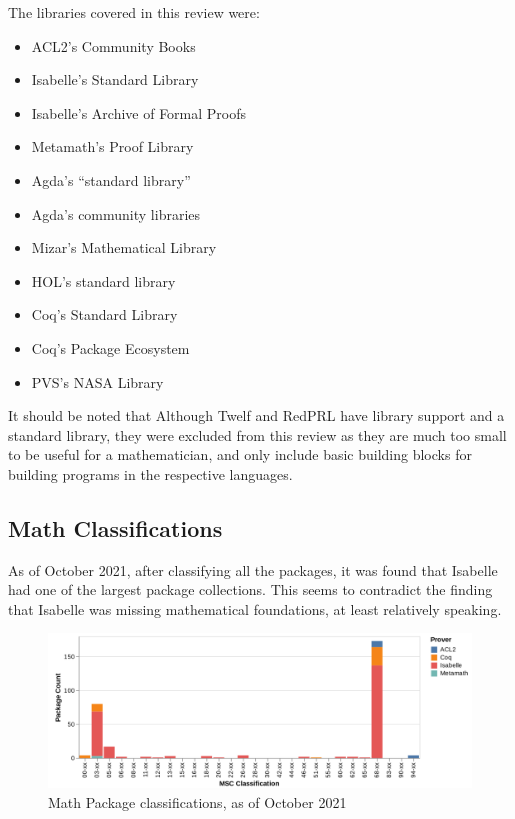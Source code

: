 \documentclass[
]{article}
\providecommand{\tightlist}{%
  \setlength{\itemsep}{0pt}\setlength{\parskip}{0pt}}
\begin{document}
The libraries covered in this review were:

\begin{itemize}
\tightlist
\item
  ACL2's Community Books
\item
  Isabelle's Standard Library
\item
  Isabelle's Archive of Formal Proofs
\item
  Metamath's Proof Library
\item
  Agda's ``standard library''
\item
  Agda's community libraries
\item
  Mizar's Mathematical Library
\item
  HOL's standard library
\item
  Coq's Standard Library
\item
  Coq's Package Ecosystem
\item
  PVS's NASA Library
\end{itemize}

It should be noted that Although Twelf and RedPRL have library support
and a standard library, they were excluded from this review as they are
much too small to be useful for a mathematician, and only include basic
building blocks for building programs in the respective languages.

\hypertarget{math-classifications}{%
\subsection{Math Classifications}\label{math-classifications}}

As of October 2021, after classifying all the packages, it was found
that Isabelle had one of the largest package collections. This seems to
contradict the finding that Isabelle was missing mathematical
foundations, at least relatively speaking.

\begin{figure}
\hypertarget{fig:math_classifications}{%
\centering
\includegraphics{./Images/MathClassification.png}
\caption{Math Package classifications, as of October
2021}\label{fig:math_classifications}
}
\end{figure}
\end{document}
